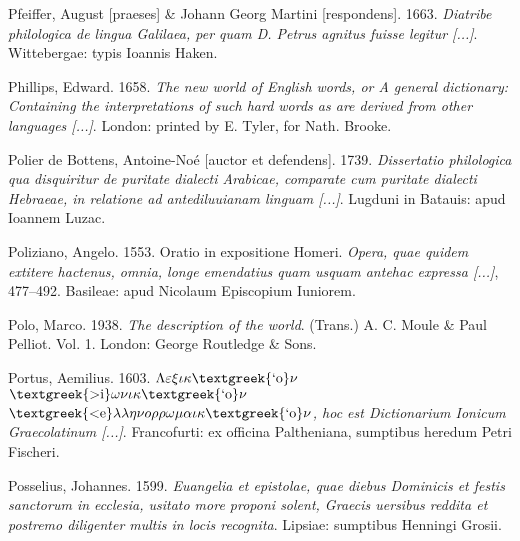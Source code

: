 \begin{styleStandard}
Pfeiffer, August [praeses] \& Johann Georg Martini [respondens]. 1663. \textit{Diatribe philologica de lingua Galilaea, per quam D. Petrus agnitus fuisse legitur [...]}. Wittebergae: typis Ioannis Haken.
\end{styleStandard}

\begin{styleStandard}
Phillips, Edward. 1658. \textit{The new world of English words, or A general dictionary: Containing the interpretations of such hard words as are derived from other languages [...]}. London: printed by E. Tyler, for Nath. Brooke.
\end{styleStandard}

\begin{styleStandard}
Polier de Bottens, Antoine-Noé [auctor et defendens]. 1739. \textit{Dissertatio philologica qua disquiritur de puritate dialecti Arabicae, comparate cum puritate dialecti Hebraeae, in relatione ad antediluuianam linguam [...]}. Lugduni in Batauis: apud Ioannem Luzac.
\end{styleStandard}

\begin{styleStandard}
Poliziano, Angelo. 1553. Oratio in expositione Homeri. \textit{Opera, quae quidem extitere hactenus, omnia, longe emendatius quam usquam antehac expressa [...]}, 477–492. Basileae: apud Nicolaum Episcopium Iuniorem.
\end{styleStandard}

\begin{styleStandard}
Polo, Marco. 1938. \textit{The description of the world}. (Trans.) A. C. Moule \& Paul Pelliot. Vol. 1. London: George Routledge \& Sons.
\end{styleStandard}

\begin{styleStandard}
Portus, Aemilius. 1603. \textit{$\Lambda \varepsilon \xi \iota \kappa \text{\textgreek{`o}}\nu $ $\text{\textgreek{>i}}\omega \nu \iota \kappa \text{\textgreek{`o}}\nu $ $\text{\textgreek{<e}}\lambda \lambda \eta \nu o\rho \rho \omega \mu \alpha \iota \kappa \text{\textgreek{`o}}\nu $, hoc est Dictionarium Ionicum Graecolatinum [...]}. Francofurti: ex officina Paltheniana, sumptibus heredum Petri Fischeri.
\end{styleStandard}

\begin{styleStandard}
Posselius, Johannes. 1599. \textit{Euangelia et epistolae, quae diebus Dominicis et festis sanctorum in ecclesia, usitato more proponi solent, Graecis uersibus reddita et postremo diligenter multis in locis recognita}. Lipsiae: sumptibus Henningi Grosii.
\end{styleStandard}

